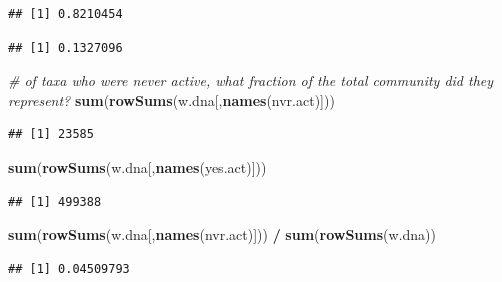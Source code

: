 \documentclass[]{article}
\newenvironment{Shaded}{\begin{snugshade}}{\end{snugshade}}
\newcommand{\CommentTok}[1]{\textcolor[rgb]{0.56,0.35,0.01}{\textit{#1}}}
\newcommand{\KeywordTok}[1]{\textcolor[rgb]{0.13,0.29,0.53}{\textbf{#1}}}
\newcommand{\NormalTok}[1]{#1}
\newcommand{\OperatorTok}[1]{\textcolor[rgb]{0.81,0.36,0.00}{\textbf{#1}}}
\newcommand{\StringTok}[1]{\textcolor[rgb]{0.31,0.60,0.02}{#1}}
\begin{document}
\begin{verbatim}
## [1] 0.8210454
\end{verbatim}

\begin{Shaded}
\end{Shaded}

\begin{verbatim}
## [1] 0.1327096
\end{verbatim}

\begin{Shaded}
\begin{Highlighting}[]
\CommentTok{# of taxa who were never active, what fraction of the total community did they represent?}
\KeywordTok{sum}\NormalTok{(}\KeywordTok{rowSums}\NormalTok{(w.dna[,}\KeywordTok{names}\NormalTok{(nvr.act)]))}
\end{Highlighting}
\end{Shaded}

\begin{verbatim}
## [1] 23585
\end{verbatim}

\begin{Shaded}
\begin{Highlighting}[]
\KeywordTok{sum}\NormalTok{(}\KeywordTok{rowSums}\NormalTok{(w.dna[,}\KeywordTok{names}\NormalTok{(yes.act)]))}
\end{Highlighting}
\end{Shaded}

\begin{verbatim}
## [1] 499388
\end{verbatim}

\begin{Shaded}
\begin{Highlighting}[]
\KeywordTok{sum}\NormalTok{(}\KeywordTok{rowSums}\NormalTok{(w.dna[,}\KeywordTok{names}\NormalTok{(nvr.act)])) }\OperatorTok{/}\StringTok{ }\KeywordTok{sum}\NormalTok{(}\KeywordTok{rowSums}\NormalTok{(w.dna))}
\end{Highlighting}
\end{Shaded}

\begin{verbatim}
## [1] 0.04509793
\end{verbatim}
\end{document}

